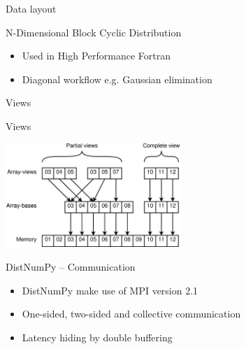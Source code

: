 \documentclass{beamer}
\begin{document}

\begin{frame}{Data layout}
\begin{center}
N-Dimensional Block Cyclic Distribution\vspace{15px}

\end{center}
\begin{itemize}
  \item Used in High Performance Fortran
  \item Diagonal workflow e.g. Gaussian elimination
\end{itemize}
\end{frame}


\begin{frame}{Views}
\begin{center}
Views\vspace{15px}

\includegraphics[width=250px]{../gfx/views}
\end{center}
\end{frame}


\begin{frame}{DistNumPy -- Communication}
\begin{itemize}
  \item DistNumPy make use of MPI version 2.1
  \item One-sided, two-sided and collective communication
  \item Latency hiding by double buffering
\end{itemize}
\end{frame}

\end{document}
